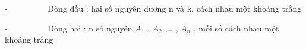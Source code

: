 -          Dòng đầu : hai số nguyên dương n và k, cách nhau một khoảng trắng  

   -          Dòng hai : n số nguyên $A_{1}$   , $A_{2}$   ,… , $A_{n}$   , mỗi số cách nhau một khoảng trắng